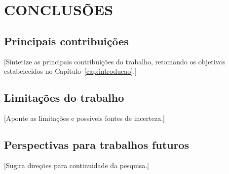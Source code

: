 %

\chapter{CONCLUSÕES}
\label{cap:conclusoes}

\section{Principais contribuições}
\label{sec:contribuicoes}

[Sintetize as principais contribuições do trabalho, retomando os
objetivos estabelecidos no Capítulo~\ref{cap:introducao}.]

\section{Limitações do trabalho}
\label{sec:limitacoes-conclusao}

[Aponte as limitações e possíveis fontes de incerteza.]

\section{Perspectivas para trabalhos futuros}
\label{sec:perspectivas}

[Sugira direções para continuidade da pesquisa.]

